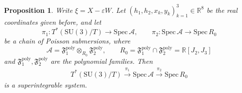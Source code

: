 \documentclass[11pt]{amsart}
\newtheorem{proposition}[theorem]{Proposition}
\theoremstyle{definition}
\theoremstyle{plain}
\theoremstyle{conclusion}
\begin{document}
\begin{proposition}
\label{prop:supersu3t}
Write $\xi=X-\varepsilon W$.   Let $  (h_1,h_2,x_k,y_k)_{k=1}^3\in\mathbb{R}^8 $ be the real coordinates given before, and let $$ \pi_1\colon T^*(\mathrm{SU}(3)/T)\longrightarrow \mathrm{Spec} \,\mathcal{A},\qquad \pi_2\colon\mathrm{Spec} \,\mathcal{A}\longrightarrow\mathrm{Spec} \, R_0 $$ be a chain of Poisson submersions, where $$ \mathcal{A}=\mathfrak{F}_1^{\mathrm{poly}} \otimes_{R_0} \mathfrak{F}_2^{\mathrm{poly}},\qquad R_0=\mathfrak{F}_1^{\mathrm{poly}}\cap \mathfrak{F}_2^{\mathrm{poly}}=\mathbb{R}[J_2,J_3] $$ and $\mathfrak{F}_1^{\mathrm{poly}},\mathfrak{F}_2^{\mathrm{poly}}$ are the polynomial families.  Then \begin{align}
      T^*(\mathrm{SU}(3)/T) \xrightarrow{\,\pi_1\,} \mathrm{Spec} \,\mathcal{A}     \xrightarrow{\,\pi_2\,} \mathrm{Spec} \, R_0
  \end{align} is a superintegrable system.
\end{proposition}
\end{document}

